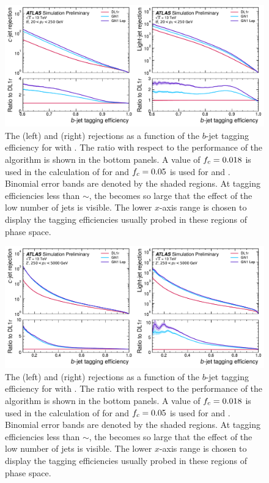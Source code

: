 \begin{figure}[!p]
    \centering
    \includegraphics[width=\textwidth]{chapters/gnn_tagger/figs/results/main/ttbar/ttbar_roc_btag.pdf}
    \caption{The \cjet (left) and \ljet (right) rejections as a function of the $b$-jet tagging efficiency for \ttbarjets with \ttbarpt.
             The ratio with respect to the performance of the \DLr algorithm is shown in the bottom panels.
             A value of $f_c = 0.018$ is used in the calculation of \Db for \DLr and $f_c = 0.05$ is used for \GNN and \GNNLep.
             Binomial error bands are denoted by the shaded regions.
             At \bjet tagging efficiencies less than $\sim$, the \lrej becomes so large that the effect of the low number of jets is visible.
             The lower $x$-axis range is chosen to display the \bjet tagging efficiencies usually probed in these regions of phase space.}
    \label{fig:ttbar_btag_roc}
\end{figure}

\begin{figure}[!p]
    \centering
    \includegraphics[width=\textwidth]{chapters/gnn_tagger/figs/results/main/zprime/zprime_roc_btag.pdf}
    \caption{The \cjet (left) and \ljet (right) rejections as a function of the $b$-jet tagging efficiency for \Zprimejets with \Zprimept.
             The ratio with respect to the performance of the \DLr algorithm is shown in the bottom panels.
             A value of $f_c = 0.018$ is used in the calculation of \Db for \DLr and $f_c = 0.05$ is used for \GNN and \GNNLep.
             Binomial error bands are denoted by the shaded regions.
             At \bjet tagging efficiencies less than $\sim$, the \lrej becomes so large that the effect of the low number of jets is visible.
             The lower $x$-axis range is chosen to display the \bjet tagging efficiencies usually probed in these regions of phase space.}
    \label{fig:zprime_btag_roc}
\end{figure}


